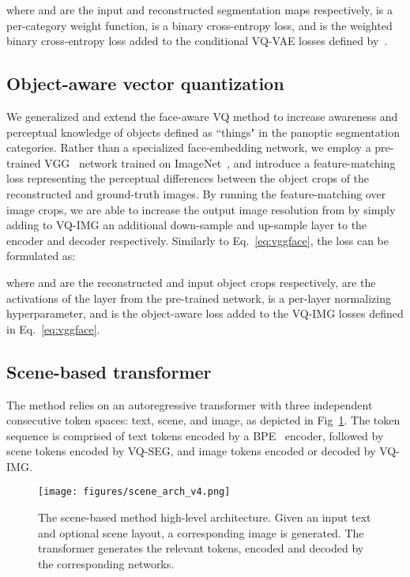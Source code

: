 \documentclass[final]{cvpr}
\begin{document}
where  and  are the input and reconstructed segmentation maps respectively,  is a per-category weight function,  is a binary cross-entropy loss, and  is the weighted binary cross-entropy loss added to the conditional VQ-VAE losses defined by~\cite{esser2021taming}.

\subsection{Object-aware vector quantization}
We generalized and extend the face-aware VQ method to increase awareness and perceptual knowledge of objects defined as ``things" in the panoptic segmentation categories. Rather than a specialized face-embedding network, we employ a pre-trained VGG~\cite{simonyan2014very} network trained on ImageNet~\cite{krizhevsky2012imagenet}, and introduce a feature-matching loss representing the perceptual differences between the object crops of the reconstructed and ground-truth images. By running the feature-matching over image crops, we are able to increase the output image resolution from  by simply adding to VQ-IMG an additional down-sample and up-sample layer to the encoder and decoder respectively. Similarly to Eq.~\ref{eq:vggface}, the loss can be formulated as:


where  and  are the reconstructed and input object crops respectively,  are the activations of the  layer from the pre-trained  network,  is a per-layer normalizing hyperparameter, and  is the object-aware loss added to the VQ-IMG losses defined in Eq.~\ref{eq:vggface}.

\subsection{Scene-based transformer}
The method relies on an autoregressive transformer with three independent consecutive token spaces: text, scene, and image, as depicted in Fig~\ref{fig:arch_scene_v1}. The token sequence is comprised of  text tokens encoded by a BPE~\cite{sennrich2015neural} encoder, followed by  scene tokens encoded by VQ-SEG, and  image tokens encoded or decoded by VQ-IMG. 

\begin{figure}[h]
    \centering
    \texttt{[image: figures/scene\_arch\_v4.png]}
    \caption{The scene-based method high-level architecture. Given an input text and optional scene layout, a corresponding image is generated. The transformer generates the relevant tokens, encoded and decoded by the corresponding networks.}
    \label{fig:arch_scene_v1}
\end{figure}
\end{document}
